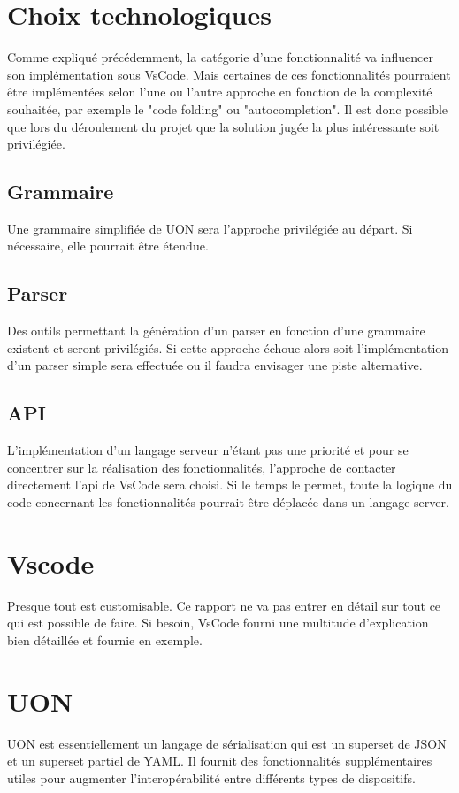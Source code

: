 \documentclass[
    iict, %
    il, %
]{heig-tb}
\begin{document}
\section{Choix technologiques}
Comme expliqué précédemment, la catégorie d’une fonctionnalité va influencer son implémentation sous VsCode. Mais certaines de ces fonctionnalités pourraient être implémentées selon l’une ou l’autre approche en fonction de la complexité souhaitée, par exemple le  "code folding" ou "autocompletion". Il est donc possible que lors du déroulement du projet que la solution jugée la plus intéressante soit privilégiée.

\subsection{Grammaire}
Une grammaire simplifiée de UON sera l’approche privilégiée au départ. Si nécessaire, elle pourrait être étendue.

\subsection{Parser}
Des outils permettant la génération d’un parser en fonction d’une grammaire existent et seront privilégiés. Si cette approche échoue alors soit l’implémentation d’un parser simple sera effectuée ou il faudra envisager une piste alternative.

\subsection{API}
L’implémentation d’un langage serveur n’étant pas une priorité et pour se concentrer sur la réalisation des fonctionnalités, l’approche de contacter directement l’api de VsCode sera choisi. Si le temps le permet, toute la logique du code concernant les fonctionnalités pourrait être déplacée dans un langage server. 

\section{Vscode}
Presque tout est customisable. Ce rapport ne va pas entrer en détail sur tout ce qui est possible de faire. Si besoin, VsCode fourni une multitude d’explication bien détaillée et fournie en exemple.

\section{UON}
UON est essentiellement un langage de sérialisation qui est un superset de JSON et un superset partiel de YAML. Il fournit des fonctionnalités supplémentaires utiles pour augmenter l'interopérabilité entre différents types de dispositifs.
\end{document}
